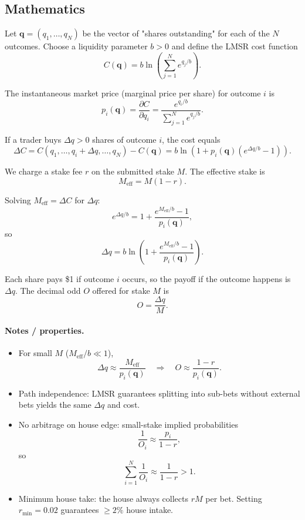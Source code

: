 \documentclass[]{article}
\begin{document}
\subsection*{Mathematics}
Let $\mathbf{q} = (q_1, \dots, q_N)$ be the vector of "shares outstanding" for each of the $N$ outcomes.
Choose a liquidity parameter $b > 0$ and define the LMSR cost function
\[
C(\mathbf{q}) = b \ln\left(\sum_{j=1}^N e^{q_j / b}\right).
\]

The instantaneous market price (marginal price per share) for outcome $i$ is
\[
p_i(\mathbf{q}) = \frac{\partial C}{\partial q_i} = \frac{e^{q_i / b}}{\sum_{j=1}^N e^{q_j / b}}.
\]

If a trader buys $\Delta q > 0$ shares of outcome $i$, the cost equals
\[
\Delta C = C(q_1,\dots,q_i+\Delta q,\dots,q_N) - C(\mathbf{q})
= b\ln\left(1 + p_i(\mathbf{q})\left(e^{\Delta q / b} - 1\right)\right).
\]

We charge a stake fee $r$ on the submitted stake $M$. The effective stake is
\[
M_{\text{eff}} = M (1 - r).
\]

Solving $M_{\text{eff}} = \Delta C$ for $\Delta q$:
\[
e^{\Delta q / b} = 1 + \frac{e^{M_{\text{eff}} / b} - 1}{p_i(\mathbf{q})},
\]
so
\[
\boxed{\Delta q = b \ln\left(1 + \frac{e^{M_{\text{eff}} / b} - 1}{p_i(\mathbf{q})}\right)}.
\]

Each share pays \$1 if outcome $i$ occurs, so the payoff if the outcome happens is $\Delta q$. The decimal odd $O$ offered for stake $M$ is
\[
\boxed{O = \frac{\Delta q}{M}}.
\]

\paragraph{Notes / properties.}
\begin{itemize}
  \item For small $M$ ($M_{\text{eff}}/b \ll 1$),
    \[
    \Delta q \approx \frac{M_{\text{eff}}}{p_i(\mathbf{q})}
    \quad\Rightarrow\quad
    O \approx \frac{1-r}{p_i(\mathbf{q})}.
    \]
  \item Path independence: LMSR guarantees splitting into sub-bets without external bets yields the same $\Delta q$ and cost.
  \item No arbitrage on house edge: small-stake implied probabilities
    \[
    \frac{1}{O_i} \approx \frac{p_i}{1-r},
    \]
    so
    \[
    \sum_{i=1}^N \frac{1}{O_i} \approx \frac{1}{1-r} > 1.
    \]
  \item Minimum house take: the house always collects $rM$ per bet. Setting $r_{\min}=0.02$ guarantees $\geq 2\%$ house intake.
\end{itemize}
\end{document}

